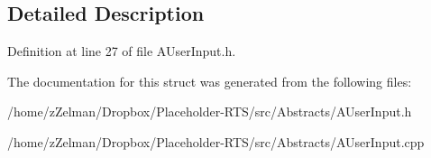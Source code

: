 \subsection{Detailed Description}


Definition at line 27 of file A\-User\-Input.\-h.



The documentation for this struct was generated from the following files\-:\begin{DoxyCompactItemize}
\item 
/home/z\-Zelman/\-Dropbox/\-Placeholder-\/\-R\-T\-S/src/\-Abstracts/A\-User\-Input.\-h\item 
/home/z\-Zelman/\-Dropbox/\-Placeholder-\/\-R\-T\-S/src/\-Abstracts/A\-User\-Input.\-cpp\end{DoxyCompactItemize}
